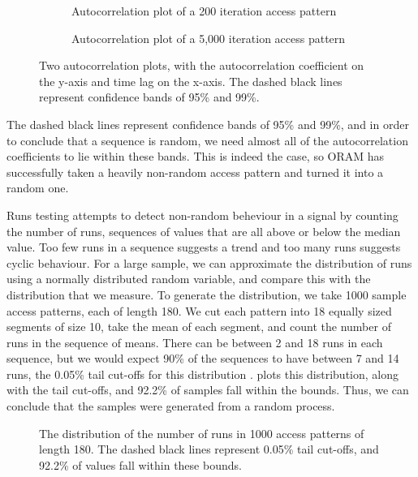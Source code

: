 \documentclass[12pt,a4paper,twoside,openright]{report}
\begin{document}
\begin{figure}
    \centering
    \begin{subfigure}{\textwidth}
        \centering
        
        \caption{Autocorrelation plot of a 200 iteration access pattern}
        \label{fig:shortAutocorr}
    \end{subfigure}
    \begin{subfigure}{\textwidth}
        \centering
        
        \caption{Autocorrelation plot of a 5,000 iteration access pattern}
        \label{fig:longAutocorr}
    \end{subfigure}
    \caption{Two autocorrelation plots, with the autocorrelation coefficient on the y-axis and time lag on the x-axis. The dashed black lines represent confidence bands of 95\% and 99\%.}
    \label{fig:autocorr}
\end{figure}

The dashed black lines represent confidence bands of 95\% and 99\%, and in order to conclude that a sequence is random, we need almost all of the autocorrelation coefficients to lie within these bands. This is indeed the case, so ORAM has successfully taken a heavily non-random access pattern and turned it into a random one.

Runs testing attempts to detect non-random beheviour in a signal by counting the number of runs, sequences of values that are all above or below the median value. Too few runs in a sequence suggests a trend and too many runs suggests cyclic behaviour. For a large sample, we can approximate the distribution of runs using a normally distributed random variable, and compare this with the distribution that we measure. To generate the distribution, we take 1000 sample access patterns, each of length 180. We cut each pattern into 18 equally sized segments of size 10, take the mean of each segment, and count the number of runs in the sequence of means. There can be between 2 and 18 runs in each sequence, but we would expect 90\% of the sequences to have between 7 and 14 runs, the 0.05\% tail cut-offs for this distribution \cite{masliah2000stationarity}.  plots this distribution, along with the tail cut-offs, and 92.2\% of samples fall within the bounds. Thus, we can conclude that the samples were generated from a random process.

\begin{figure}
    \centering
    
    \caption{The distribution of the number of runs in 1000 access patterns of length 180. The dashed black lines represent 0.05\% tail cut-offs, and 92.2\% of values fall within these bounds.}
    \label{fig:runsTestPlot}
\end{figure}
\end{document}
